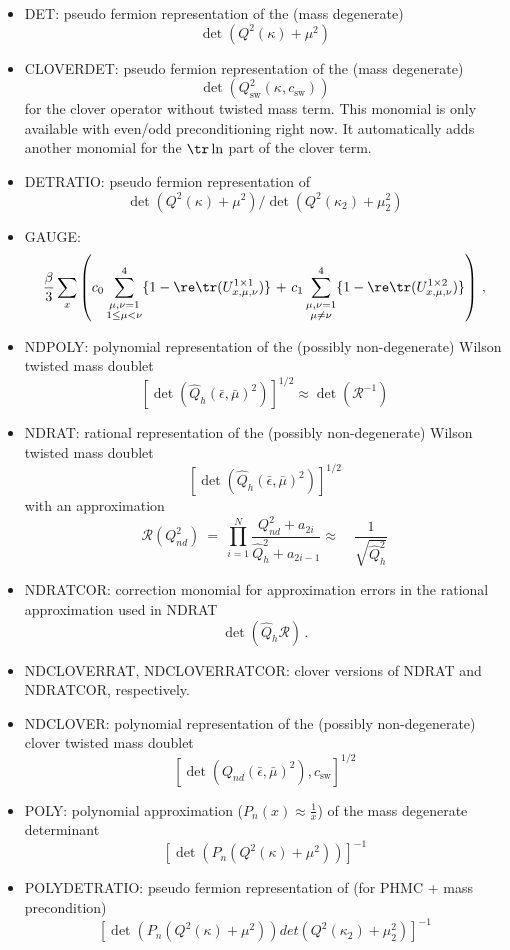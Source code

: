 \begin{itemize}
\item {\ttfamily DET}: pseudo fermion representation of the (mass degenerate)\\
  \[
  \det(Q^2(\kappa) + \mu^2)
  \]
\item {\ttfamily CLOVERDET}: pseudo fermion representation of the
  (mass degenerate)
  \[
  \det(Q_\mathrm{sw}^2(\kappa, c_\mathrm{sw}))
  \]
  for the clover operator without twisted mass term. This monomial is
  only available with even/odd preconditioning right now. It
  automatically adds another monomial for the $\tr\ln$ part of the
  clover term.

\item {\ttfamily DETRATIO}: pseudo fermion representation of\\
  \[
  \det(Q^2(\kappa) + \mu^2)/\det(Q^2(\kappa_2) + \mu_2^2)
  \]
\item {\ttfamily GAUGE}:\\
  \[
  \frac{\beta}{3}\sum_x\left(  c_0\sum_{\substack{
        \mu,\nu=1\\1\leq\mu<\nu}}^4\{1-\re\tr(U^{1\times1}_{x,\mu,\nu})\}\Bigr. 
    \Bigl.\ +\ 
    c_1\sum_{\substack{\mu,\nu=1\\\mu\neq\nu}}^4\{1
    -\re\tr(U^{1\times2}_{x,\mu,\nu})\}\right)\,  ,
  \]
\item {\ttfamily NDPOLY}: polynomial representation of the (possibly
  non-degenerate) Wilson twisted mass doublet
  \[
  [\det(\hat Q_{h}(\bar\epsilon, \bar\mu)^2)]^{1/2} \approx \det(\mathcal{R}^{-1})
  \]
\item {\ttfamily NDRAT}: rational representation of the (possibly
  non-degenerate) Wilson twisted mass doublet
  \[
  [\det(\hat Q_{h}(\bar\epsilon, \bar\mu)^2)]^{1/2}
  \]
  with an approximation
  \[
  \mathcal{R}(Q_{nd}^2)\ = \ \prod_{i = 1}^N \frac{Q_{nd}^2 +
    a_{2i}}{\hat Q_{h}^2 + a_{2i-1}}\approx\quad\frac{1}{\sqrt{\hat Q_{h}^2}}
  \]
\item {\ttfamily NDRATCOR}: correction monomial for approximation
  errors in the rational approximation used in {\ttfamily NDRAT}
  \[
  \det\left( \hat Q_h \mathcal{R} \right)\,.
  \]
\item {\ttfamily NDCLOVERRAT, NDCLOVERRATCOR}: clover versions of
  {\ttfamily NDRAT} and {\ttfamily NDRATCOR}, respectively.
\item {\ttfamily NDCLOVER}: polynomial representation of the (possibly
  non-degenerate) clover twisted mass doublet
  \[
  [\det(Q_{nd}(\bar\epsilon, \bar\mu)^2), c_\mathrm{sw}]^{1/2}
  \]
\item {\ttfamily POLY}: polynomial approximation ($P_n(x) \approx \frac{1}{x}$) of the mass degenerate determinant\\
  \[
  \left[\det(P_{n}(Q^2(\kappa) + \mu^2))\right]^{-1}
  \]
\item {\ttfamily POLYDETRATIO}: pseudo fermion representation of (for PHMC + mass precondition)\\
  \[
  \left[\det(P_{n}(Q^2(\kappa) + \mu^2)) det(Q^2(\kappa_2) + \mu^2_2)\right]^{-1}
  \]
\end{itemize}
